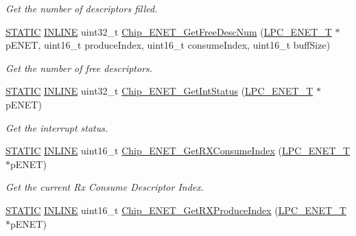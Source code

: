 \begin{DoxyCompactItemize}
\begin{DoxyCompactList}\small\item\em Get the number of descriptors filled. \end{DoxyCompactList}\item 
\hyperlink{group__LPC__Types__Public__Macros_ga10b2d890d871e1489bb02b7e70d9bdfb}{S\+T\+A\+T\+IC} \hyperlink{group__LPC__Types__Public__Types_ga2eb6f9e0395b47b8d5e3eeae4fe0c116}{I\+N\+L\+I\+NE} uint32\+\_\+t \hyperlink{group__ENET__17XX__40XX_ga4d0afde7abd542590c1bb53fba4d90b1}{Chip\+\_\+\+E\+N\+E\+T\+\_\+\+Get\+Free\+Desc\+Num} (\hyperlink{structLPC__ENET__T}{L\+P\+C\+\_\+\+E\+N\+E\+T\+\_\+T} $\ast$p\+E\+N\+ET, uint16\+\_\+t produce\+Index, uint16\+\_\+t consume\+Index, uint16\+\_\+t buff\+Size)
\begin{DoxyCompactList}\small\item\em Get the number of free descriptors. \end{DoxyCompactList}\item 
\hyperlink{group__LPC__Types__Public__Macros_ga10b2d890d871e1489bb02b7e70d9bdfb}{S\+T\+A\+T\+IC} \hyperlink{group__LPC__Types__Public__Types_ga2eb6f9e0395b47b8d5e3eeae4fe0c116}{I\+N\+L\+I\+NE} uint32\+\_\+t \hyperlink{group__ENET__17XX__40XX_ga5931404e2db29a1b4cdf357edf79504d}{Chip\+\_\+\+E\+N\+E\+T\+\_\+\+Get\+Int\+Status} (\hyperlink{structLPC__ENET__T}{L\+P\+C\+\_\+\+E\+N\+E\+T\+\_\+T} $\ast$p\+E\+N\+ET)
\begin{DoxyCompactList}\small\item\em Get the interrupt status. \end{DoxyCompactList}\item 
\hyperlink{group__LPC__Types__Public__Macros_ga10b2d890d871e1489bb02b7e70d9bdfb}{S\+T\+A\+T\+IC} \hyperlink{group__LPC__Types__Public__Types_ga2eb6f9e0395b47b8d5e3eeae4fe0c116}{I\+N\+L\+I\+NE} uint16\+\_\+t \hyperlink{group__ENET__17XX__40XX_gae79ff7cdffb9e43c95fb309ca7c16aa2}{Chip\+\_\+\+E\+N\+E\+T\+\_\+\+Get\+R\+X\+Consume\+Index} (\hyperlink{structLPC__ENET__T}{L\+P\+C\+\_\+\+E\+N\+E\+T\+\_\+T} $\ast$p\+E\+N\+ET)
\begin{DoxyCompactList}\small\item\em Get the current Rx Consume Descriptor Index. \end{DoxyCompactList}\item 
\hyperlink{group__LPC__Types__Public__Macros_ga10b2d890d871e1489bb02b7e70d9bdfb}{S\+T\+A\+T\+IC} \hyperlink{group__LPC__Types__Public__Types_ga2eb6f9e0395b47b8d5e3eeae4fe0c116}{I\+N\+L\+I\+NE} uint16\+\_\+t \hyperlink{group__ENET__17XX__40XX_gaa70d279d6bb31b783656b31fe3a1cf8f}{Chip\+\_\+\+E\+N\+E\+T\+\_\+\+Get\+R\+X\+Produce\+Index} (\hyperlink{structLPC__ENET__T}{L\+P\+C\+\_\+\+E\+N\+E\+T\+\_\+T} $\ast$p\+E\+N\+ET)

\end{DoxyCompactItemize}

